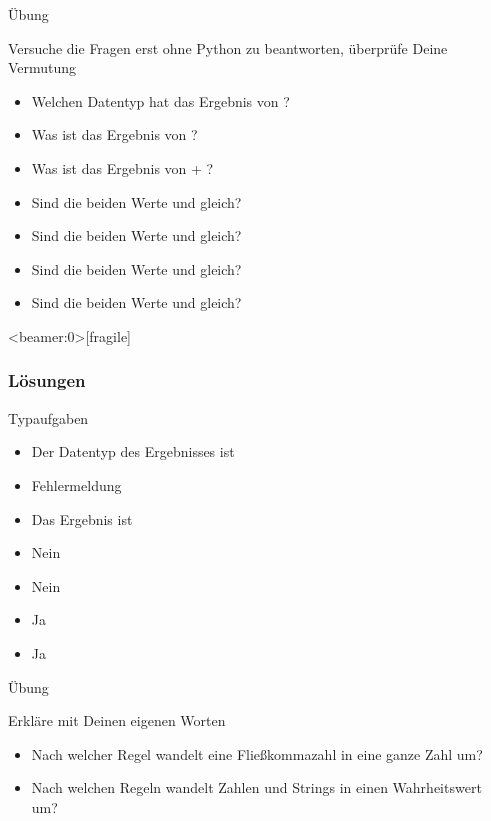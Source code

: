 	
	\begin{frame}{Übung}
		\begin{block}{Versuche die Fragen erst ohne Python zu beantworten, überprüfe Deine Vermutung}
			\begin{itemize}
				\item Welchen Datentyp hat das Ergebnis von  ?
				\item Was ist das Ergebnis von  ? 
				\item Was ist das Ergebnis von \py{"2"} + ? 
				\item Sind die beiden Werte  und  gleich? 
				\item Sind die beiden Werte  und  gleich? 
				\item Sind die beiden Werte  und  gleich? 
				\item Sind die beiden Werte  und  gleich? 
			\end{itemize}
		\end{block}
	\end{frame}


\begin{frame}<beamer:0>[fragile]
\frametitle{Lösungen}
\begin{solutionblock}{Typaufgaben}
	\begin{itemize}
		\item Der Datentyp des Ergebnisses ist 
		\item Fehlermeldung
		\item Das Ergebnis ist 
		\item Nein
		\item Nein 
		\item Ja
		\item Ja
	\end{itemize}
\end{solutionblock}
\end{frame}

	\begin{frame}{Übung}
	
	\begin{block}{Erkläre mit Deinen eigenen Worten}
		\begin{itemize}
			\item Nach welcher Regel wandelt  eine Fließkommazahl in eine ganze Zahl um? 
			\item Nach welchen Regeln wandelt  Zahlen und Strings in einen Wahrheitswert um? 
		\end{itemize}
	\end{block}
	
	
\end{frame}








